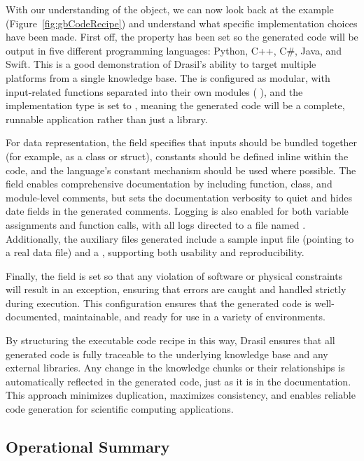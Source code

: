 With our understanding of the  object, we can now look back at 
the \gb{} example (Figure~\ref{fig:gbCodeRecipe}) and understand what 
specific implementation choices have been made. First off, the  
property has been set so the generated code will be output in five different 
programming languages: Python, C++, C\#, Java, and Swift. This is a good 
demonstration of Drasil's ability to target multiple platforms from a 
single knowledge base. The  is configured as modular, with 
input-related functions separated into their own modules (
), and the implementation type is set to 
, meaning the generated code will be a complete, runnable 
application rather than just a library. 

For data representation, the  field specifies that inputs 
should be bundled together (for example, as a class or struct), constants 
should be defined inline within the code, and the language's constant mechanism 
should be used where possible. The  field enables comprehensive 
documentation by including function, class, and module-level comments, but sets 
the documentation verbosity to quiet and hides date fields in the generated 
comments. Logging is also enabled for both variable assignments and function 
calls, with all logs directed to a file named . Additionally, 
the auxiliary files generated include a sample input file (pointing to a real 
data file) and a , supporting both usability and reproducibility. 

Finally, the  field is set so that any violation of 
software or physical constraints will result in an exception, ensuring that 
errors are caught and handled strictly during execution. This configuration 
ensures that the generated \gb{} code is well-documented, maintainable, and 
ready for use in a variety of environments.

By structuring the executable code recipe in this way, Drasil ensures that all 
generated code is fully traceable to the underlying knowledge base and any 
external libraries. Any change in the knowledge chunks or their relationships 
is automatically reflected in the generated code, just as it is in the 
documentation. This approach minimizes duplication, maximizes consistency, and 
enables reliable code generation for scientific computing applications.

\subsection{Operational Summary}

